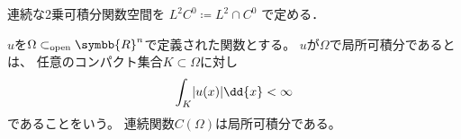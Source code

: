 \documentclass[../sotsu.tex]{subfiles}
\begin{document}
\begin{definition}
    連続な2乗可積分関数空間を
    \( L^2 C^0 \coloneq L^2 \cap C^0 \)
    で定める．
\end{definition}


$u$を$\Omega \subset_{\text{open}} \symbb{R}^n$で定義された関数とする。
$u$が$\Omega$で局所可積分であるとは、
任意のコンパクト集合$K \subset \Omega$に対し
\begin{equation*}
    \int_K \abs{ u(x) } \dd{x} < \infty
\end{equation*}
であることをいう。
連続関数$C(\Omega)$は局所可積分である。
\end{document}

